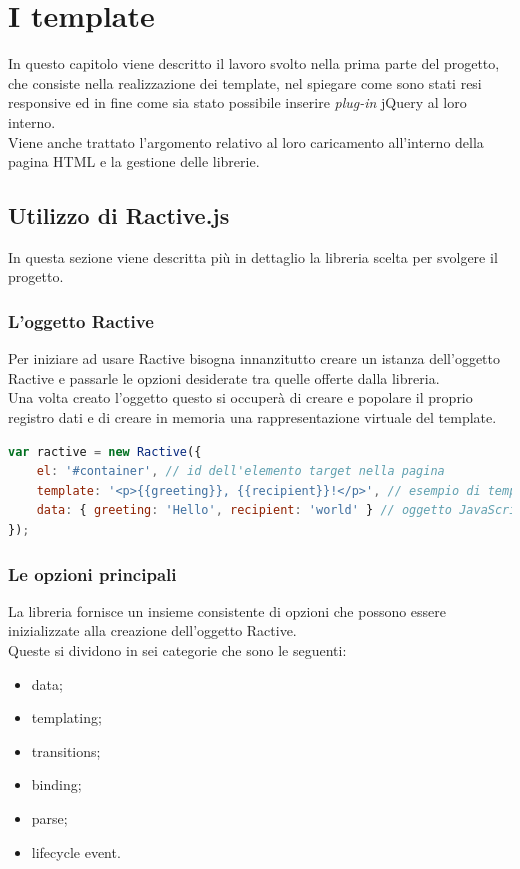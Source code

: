 
\chapter{I template}\label{cap:template}
In questo capitolo viene descritto il lavoro svolto nella prima parte del progetto, che consiste nella realizzazione dei template, nel spiegare come sono stati resi responsive ed in fine come sia stato possibile inserire \textit{plug-in} jQuery al loro interno.\\
Viene anche trattato l'argomento relativo al loro caricamento all'interno della pagina HTML e la gestione delle librerie.
\section{Utilizzo di Ractive.js}
In questa sezione viene descritta più in dettaglio la libreria scelta per svolgere il progetto.
\subsection{L'oggetto Ractive}
Per iniziare ad usare Ractive bisogna innanzitutto creare un istanza dell'oggetto Ractive e passarle le opzioni desiderate tra quelle offerte dalla libreria.\\
Una volta creato l'oggetto questo si occuperà di creare e popolare il proprio registro dati e di creare in memoria una rappresentazione virtuale del template.\\
\begin{lstlisting}[language=JavaScript, caption=Creazione di un oggetto Ractive.]
var ractive = new Ractive({
	el: '#container', // id dell'elemento target nella pagina
	template: '<p>{{greeting}}, {{recipient}}!</p>', // esempio di template
	data: { greeting: 'Hello', recipient: 'world' } // oggetto JavaScript contenente i dati
});
\end{lstlisting}

\newpage

\subsection{Le opzioni principali}
La libreria fornisce un insieme consistente di opzioni che possono essere inizializzate alla creazione dell'oggetto Ractive.\\
Queste si dividono in sei categorie che sono le seguenti:
\begin{itemize}
	\item data;
	\item templating;
	\item transitions;
	\item binding;
	\item parse;
	\item lifecycle event.
\end{itemize}


